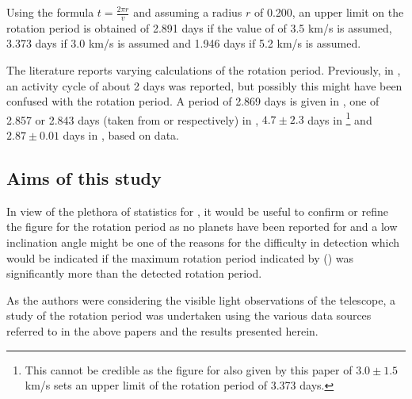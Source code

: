 Using the formula $t = \frac{2 \pi r}{v}$ and assuming a radius $r$ of
0.200\rsun, an upper limit on the rotation period is obtained of 2.891 days if
the value of {\vsini} of 3.5 km/s is assumed, 3.373 days if 3.0 km/s is assumed
and 1.946 days if 5.2 km/s is assumed.

The literature reports varying calculations of the rotation period.
Previously, in \citet{jarrett76}, an activity cycle of about 2 days was reported, but
possibly this might have been confused with the rotation period. 
A period of 2.869 days is given in \citet{kiraga07}, one of 2.857
or 2.843 days (taken from {\ktwo} or {\MEarth} respectively) in \citet{newton18},
$4.7 \pm 2.3$ days in \citet{reiners18}\footnote{This cannot be credible as the
figure for {\vsini} also given by this paper of $3.0 \pm 1.5$ km/s sets an
upper limit of the rotation period of 3.373 days.} and $2.87 \pm 0.01$ days in
\citet{diezalonso19}, based on {\asas} data.

\subsection{Aims of this study}

In view of the plethora of statistics for \ross, it would be useful to confirm
or refine the figure for the rotation period as no planets have been reported for {\ross}
and a low inclination angle might be one of the
reasons for the difficulty in detection which would be indicated if the maximum
rotation period indicated by (\vsini) was significantly more than the detected
rotation period.

As the authors were considering the visible light observations of the {\rem}
telescope, a study of the rotation period was undertaken using the various data
sources referred to in the above papers and the results presented herein.
